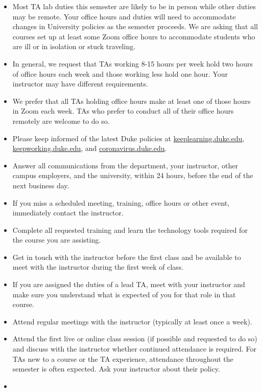 \documentclass[
]{article}
\begin{document}
\begin{itemize}
\item
  Most TA lab duties this semester are likely to be in person while other duties may be remote. Your office hours and duties will need to accommodate changes in University policies as the semester proceeds. We are asking that all courses set up at least some Zoom office hours to accommodate students who are ill or in isolation or stuck traveling.
\item
  In general, we request that TAs working 8-15 hours per week hold two hours of office hours each week and those working less hold one hour. Your instructor may have different requirements.
\item
  We prefer that all TAs holding office hours make at least one of those hours in Zoom each week. TAs who prefer to conduct all of their office hours remotely are welcome to do so.
\item
  Please keep informed of the latest Duke policies at \href{https://keeplearning.duke.edu/}{keeplearning.duke.edu}, \href{https://keepworking.duke.edu/}{keepworking.duke.edu}, and \href{https://coronavirus.duke.edu/}{coronavirus.duke.edu}.
\item
  Answer all communications from the department, your instructor, other campus employers, and the university, within 24 hours, before the end of the next business day.
\item
  If you miss a scheduled meeting, training, office hours or other event, immediately contact the instructor.
\item
  Complete all requested training and learn the technology tools required for the course you are assisting.
\item
  Get in touch with the instructor before the first class and be available to meet with the instructor during the first week of class.
\item
  If you are assigned the duties of a lead TA, meet with your instructor and make sure you understand what is expected of you for that role in that course.
\item
  Attend regular meetings with the instructor (typically at least once a week).
\item
  Attend the first live or online class session (if possible and requested to do so) and discuss with the instructor whether continued attendance is required. For TAs new to a course or the TA experience, attendance throughout the semester is often expected. Ask your instructor about their policy.
\item

\end{itemize}
\end{document}
